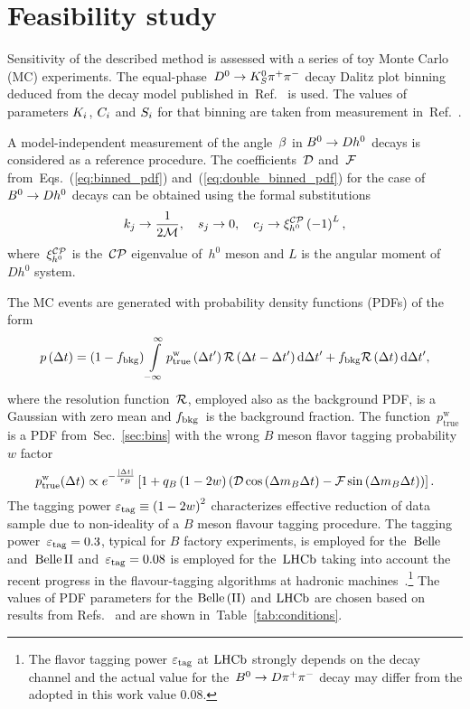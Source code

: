 \documentclass[a4paper,11pt]{article}
\begin{document}
\section{Feasibility study}\label{sec:feas}
Sensitivity of the described method is assessed with a series of 
toy Monte Carlo (MC) experiments.  The equal-phase~$D^0 \to K_S^0\pi^+\pi^-$ decay Dalitz plot 
binning deduced from the decay model published in~Ref.~\cite{kspp_anton} is 
used.  The values of parameters $K_i$, $C_i$ and $S_i$ for that binning are 
taken from measurement in~Ref.~\cite{CLEO_phasees}.

A model-independent measurement of the angle~$\beta$ in $B^0\to D h^0$ decays is 
considered as a reference procedure.  The coefficients~$\mathcal{D}$ and~$\mathcal{F}$ 
from~Eqs.~(\ref{eq:binned_pdf}) and~(\ref{eq:double_binned_pdf}) for the 
case of~$B^0\to D h^0$ decays can be obtained using the formal substitutions
\begin{equation}
 k_j \to \frac{1}{2\mathcal{M}},\quad s_j\to0,\quad c_j\to\xi_{h^0}^{\mathcal{CP}}\left( -1 \right)^L,
\end{equation}
where~$\xi_{h^0}^{\mathcal{CP}}$ is the~$\mathcal{CP}$ eigenvalue of~$h^0$ meson and 
$L$ is the angular moment of $Dh^0$ system.

The MC events are generated with probability density functions (PDFs) of 
the form
\begin{equation}
 p\left(\Delta t\right) = \left( 1 - f_{{\rm bkg}}\right)\int\limits_{-\infty}^{\infty} 
 p_{\textrm{true}}^{\textrm{w}}\left(\Delta t{}^{\prime}\right) \mathcal{R}\left(\Delta t-\Delta t{}^{\prime}\right) 
 \mathrm{d}\Delta t{}^{\prime} + f_{{\rm bkg}}\mathcal{R}\left(\Delta t\right)\mathrm{d}\Delta t{}^{\prime},
\end{equation}
where the resolution function~$\mathcal{R}$, employed also as the background PDF, is a 
Gaussian with zero mean and $f_{{\rm bkg}}$~is the background fraction.
The function~$p_{\textrm{true}}^{\textrm{w}}$ is a PDF from~Sec.~\ref{sec:bins} with 
the wrong $B$ meson flavor tagging probability $w$ factor
\begin{equation}\label{eq:raw_pdf_wtag}
  p_{\textrm{true}}^{\textrm{w}}(\Delta t) \propto
  e^{-\frac{\left|\Delta t\right|}{\tau_B}}\left[1 + q_B\left( 1-2w \right)\left(\mathcal{D}\cos{\left(\Delta m_B\Delta t\right)}-\mathcal{F}\sin{\left(\Delta m_B\Delta t\right)}\right)\right].
\end{equation}
The tagging power $\varepsilon_{\mathrm{tag}}\equiv \left( 1 - 2w\right)^2$ characterizes effective reduction of 
data sample due to non-ideality of a $B$ meson flavour tagging procedure.  The 
tagging power~$\varepsilon_{\mathrm{tag}}=0.3$, typical for $B$ factory experiments, is employed for the~$\mathrm{Belle}$ 
and~$\mathrm{Belle}\,\mathrm{II}$ and~$\varepsilon_{\mathrm{tag}}=0.08$ is employed for the~$\mathrm{LHCb}$ 
taking into account the recent progress in the flavour-tagging 
algorithms at hadronic machines~\cite{bdd_lhcb_tag}.\footnote{The flavor tagging power
$\varepsilon_{\mathrm{tag}}$ at $\mathrm{LHCb}$ strongly depends on the decay channel and the actual value 
for the~$B^0\to D\pi^+\pi^-$ decay may differ from the adopted in this work value $0.08$.}
The values of PDF parameters for the $\mathrm{Belle}\,(\mathrm{II})$ and $\mathrm{LHCb}$ are 
chosen based on results from 
Refs.~\cite{cosbeta_belle, sinbeta_bcud, bdpp_lhcb} and are shown 
in~Table~\ref{tab:conditions}.
\end{document}
